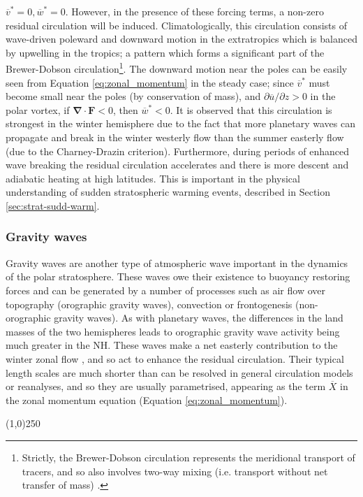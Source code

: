 $\overline{v}^*=0, \overline{w}^*=0$.  However, in the presence of these forcing
terms, a non-zero residual circulation will be induced. Climatologically, this
circulation consists of wave-driven poleward and downward motion in the
extratropics which is balanced by upwelling in the tropics; a pattern which
forms a significant part of the Brewer-Dobson circulation\footnote{Strictly, the
  Brewer-Dobson circulation represents the meridional transport of tracers, and
  so also involves two-way mixing (i.e. transport without net transfer of mass)
  \citep{Hall1994}.}. The downward motion near the poles can be easily seen from
Equation \ref{eq:zonal_momentum} in the steady case; since $\overline{v}^*$ must
become small near the poles (by conservation of mass), and
$\partial\overline{u}/\partial z > 0$ in the polar vortex, if
$\mathbf{\nabla\cdot F} < 0$, then $\overline{w}^*<0$. It is observed that this
circulation is strongest in the winter hemisphere due to the fact that more
planetary waves can propagate and break in the winter westerly flow than the
summer easterly flow (due to the Charney-Drazin criterion). Furthermore, during
periods of enhanced wave breaking the residual circulation accelerates and there
is more descent and adiabatic heating at high latitudes. This is important in
the physical understanding of sudden stratospheric warming events, described in
Section \ref{sec:strat-sudd-warm}.


\subsubsection{Gravity waves}

Gravity waves are another type of atmospheric wave important in the dynamics of
the polar stratosphere. These waves owe their existence to buoyancy restoring
forces and can be generated by a number of processes such as air flow over
topography (orographic gravity waves), convection or frontogenesis
(non-orographic gravity waves). As with planetary waves, the differences in the
land masses of the two hemispheres leads to orographic gravity wave activity
being much greater in the NH. These waves make a net easterly contribution to
the winter zonal flow \citep[e.g.,][]{Seviour2012}, and so act to enhance the
residual circulation. Their typical length scales are much shorter than can be
resolved in general circulation models or reanalyses, and so they are usually
parametrised, appearing as the term $\overline{X}$ in the zonal momentum
equation (Equation \ref{eq:zonal_momentum}).
\begin{center}
\line(1,0){250}
\end{center}


